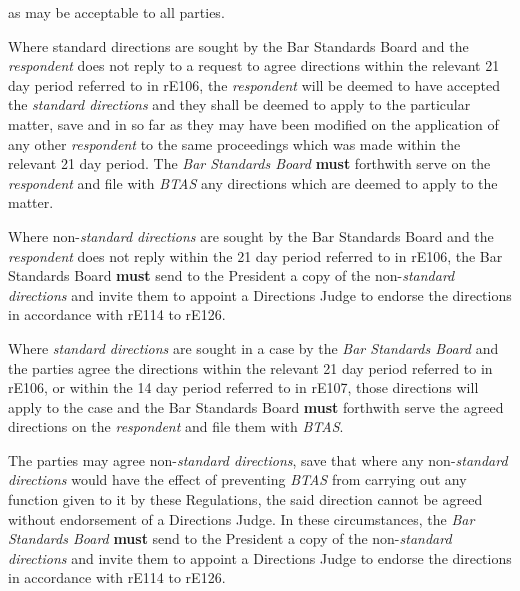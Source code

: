 as may be acceptable to all parties.\ln
{}\par
{}
Where standard directions are sought by the Bar Standards Board and
the \emph{respondent} does not reply to a request to agree directions
within the relevant 21 day period referred to in rE106,
the \emph{respondent} will be deemed to have accepted the \emph{standard
directions} and they shall be deemed to apply to the particular matter,
save and in so far as they may have been modified on the application of
any other \emph{respondent} to the same proceedings which was made
within the relevant 21 day period. The \emph{Bar Standards Board}  \textcolor{myred}{\textbf{must}}
forthwith serve on the\emph{ respondent} and file with \emph{BTAS} any
directions which are deemed to apply to the matter.\\
\par
Where non-\emph{standard directions} are sought by the Bar Standards
Board and the \emph{respondent} does not reply within the 21 day period
referred to in rE106, the Bar Standards Board  \textcolor{myred}{\textbf{must}} send to the President
a copy of the non-\emph{standard directions} and invite them to appoint
a Directions Judge to endorse the directions in accordance with rE114 to
rE126.\\
\par
{}
Where \emph{standard directions} are sought in a case by the \emph{Bar
Standards Board} and the parties agree the directions within the
relevant 21 day period referred to in rE106, or within the 14 day period
referred to in rE107, those directions will apply to the case and the
Bar Standards Board  \textcolor{myred}{\textbf{must}} forthwith serve the agreed directions on
the \emph{respondent} and file them with \emph{BTAS}.\\
\par
The parties may agree non-\emph{standard directions}, save that where
any non-\emph{standard directions} would have the effect of
preventing \emph{BTAS} from carrying out any function given to it by
these Regulations, the said direction cannot be agreed without
endorsement of a Directions Judge. In these circumstances, the \emph{Bar
Standards Board}  \textcolor{myred}{\textbf{must}} send to the President a copy of the
non-\emph{standard directions} and invite them to appoint a Directions
Judge to endorse the directions in accordance with rE114 to rE126.\\
